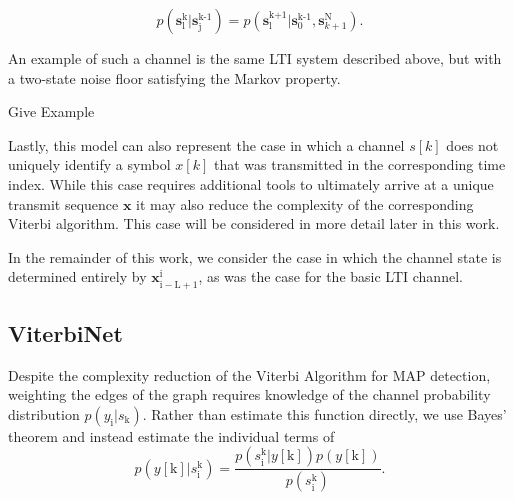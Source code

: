 \documentclass[12pt,a4paper]{report}
\begin{document}
\begin{equation}
p(\mathbf{s}_{\text{l}}^{\text{k}}|\mathbf{s}_{\text{j}}^{\text{k-1}}) = p(\mathbf{s}_{\text{l}}^{\text{k+1}}|\mathbf{s}_{0}^{\text{k-1}},\mathbf{s}_{k+1}^{\text{N}}).
\end{equation}

An example of such a channel is the same LTI system described above, but with a two-state noise floor satisfying the Markov property. 

Give Example

\par
Lastly, this model can also represent the case in which a channel $s[k]$ does not uniquely identify a symbol $x[k]$ that was transmitted in the corresponding time index. While this case requires additional tools to ultimately arrive at a unique transmit sequence $\mathbf{x}$ it may also reduce the complexity of the corresponding Viterbi algorithm. This case will be considered in more detail later in this work.
\par
In the remainder of this work, we consider the case in which the  channel state is determined entirely by $\mathbf{x}_{\mathrm{i-L+1}}^{\mathrm{i}}$, as was the case for the basic LTI channel. 

\subsection{ViterbiNet}

Despite the complexity reduction of the Viterbi Algorithm for MAP detection, weighting the edges of the graph requires knowledge of the channel probability distribution $p(y_{\mathrm{i}}|s_{\mathrm{k}})$. Rather than estimate this function directly, we use Bayes' theorem and instead estimate the individual terms of
\begin{equation*}
p(y[\mathrm{k}]|s_{\text{i}}^{\text{k}}) = 
\frac
{p(s_{\text{i}}^{\text{k}}|y[\mathrm{k}])p(y[\mathrm{k}])}
{p(s_{\text{i}}^{\text{k}})}.
\end{equation*}
\end{document}
